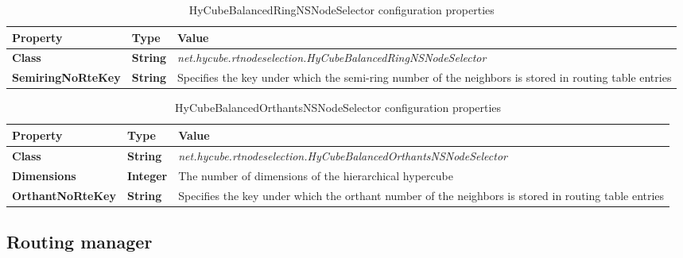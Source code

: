\begin{table}
\scriptsize
\begin{center}
\begin{tabular}{p{3cm} p{3cm} p{8.5cm}}
	\hline
	\textbf{Property}						& \textbf{Type}					& \textbf{Value}					\\[1mm]
    \hline
	\textbf{Class}							& \textbf{String}				& \textit{net.hycube.rtnodeselection.HyCubeBalancedRingNSNodeSelector}			\\[1.5mm]
    \textbf{SemiringNoRteKey}				& \textbf{String}				& Specifies the key under which the semi-ring number of the neighbors is stored in routing table entries				\\[1.5mm]
    \hline
\end{tabular}
\end{center}
\caption{HyCubeBalancedRingNSNodeSelector configuration properties}
\label{tab:libHyCubeBalancedRingNSNodeSelector}
\end{table}

\begin{table}
\scriptsize
\begin{center}
\begin{tabular}{p{3cm} p{3cm} p{8.5cm}}
	\hline
	\textbf{Property}						& \textbf{Type}					& \textbf{Value}					\\[1mm]
    \hline
	\textbf{Class}							& \textbf{String}				& \textit{net.hycube.rtnodeselection.HyCubeBalancedOrthantsNSNodeSelector}										\\[1.5mm]
    \textbf{Dimensions}						& \textbf{Integer}				& The number of dimensions of the hierarchical hypercube														\\[1.5mm]
	\textbf{OrthantNoRteKey}				& \textbf{String}				& Specifies the key under which the orthant number of the neighbors is stored in routing table entries			\\[1.5mm]
    \hline
\end{tabular}
\end{center}
\caption{HyCubeBalancedOrthantsNSNodeSelector configuration properties}
\label{tab:libHyCubeBalancedOrthantsNSNodeSelector}
\end{table}











\subsection{Routing manager}
\label{sec:libRoutingManager}


